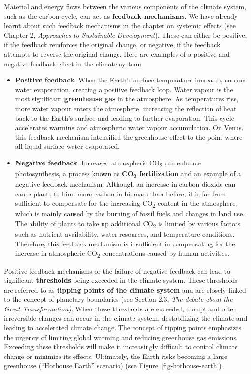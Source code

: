 \documentclass[
  a4paper,
  DIV=11,
  numbers=noendperiod,
  oneside,
  openany]{scrreprt}
\begin{document}
Material and energy flows between the various components of the climate
system, such as the carbon cycle, can act as \textbf{feedback
mechanisms}. We have already learnt about such feedback mechanisms in
the chapter on systemic effects (see Chapter 2, \emph{Approaches to
Sustainable Development}). These can either be positive, if the feedback
reinforces the original change, or negative, if the feedback attempts to
reverse the original change. Here are examples of a positive and
negative feedback effect in the climate system:

\begin{itemize}
\item
  \textbf{Positive feedback}: When the Earth's surface temperature
  increases, so does water evaporation, creating a positive feedback
  loop. Water vapour is the most significant \textbf{greenhouse gas} in
  the atmosphere. As temperatures rise, more water vapour enters the
  atmosphere, increasing the reflection of heat back to the Earth's
  surface and leading to further evaporation. This cycle accelerates
  warming and atmospheric water vapour accumulation. On Venus, this
  feedback mechanism intensified the greenhouse effect to the point
  where all liquid surface water evaporated.
\item
  \textbf{Negative feedback}: Increased atmospheric CO\textsubscript{2}
  can enhance photosynthesis, a process known as
  \textbf{CO\textsubscript{2} fertilization} and an example of a
  negative feedback mechanism. Although an increase in carbon dioxide
  can cause plants to bind more carbon in biomass than before, it is far
  from sufficient to compensate for the increasing CO\textsubscript{2}
  content in the atmosphere, which is mainly caused by the burning of
  fossil fuels and changes in land use. The ability of plants to take up
  additional CO\textsubscript{2} is limited by various factors such as
  nutrient availability, water resources, and temperature conditions.
  Therefore, this feedback mechanism is insufficient in compensating for
  the increase in atmospheric CO\textsubscript{2} concentrations caused
  by human activities.
\end{itemize}

Positive feedback mechanisms or the failure of negative feedback can
lead to significant \textbf{thresholds} being exceeded in the climate
system. These thresholds are referred to as \textbf{tipping points of
the climate system} and are closely linked to the concept of planetary
boundaries (see Section 2.3, \emph{The debate about the Great
Transformation)}. When these thresholds are exceeded, abrupt and often
irreversible changes can occur in the climate system, destabilizing the
climate and leading to accelerated climate change. The concept of
tipping points emphasizes the urgency of limiting global warming and
reducing greenhouse gas emissions. Exceeding these thresholds will make
it increasingly difficult to control climate change or minimize its
effects. Ultimately, the Earth risks becoming a large greenhouse
(``Hothouse Earth'' scenario) (see Figure~\ref{fig-hothouse-earth}).
\end{document}

